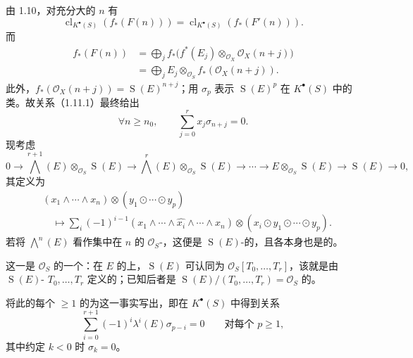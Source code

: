 由 1.10，对充分大的 $n$ 有
\[
\operatorname{cl}_{K^\bullet(S)}(f_*(F(n)))=
\operatorname{cl}_{K^\bullet(S)}(f_*(F'(n))).
\]
而
\[
\begin{aligned}
f_*(F(n))
&=\bigoplus_j f_*\bigl(f^*(E_j)\otimes_{\mathcal O_X}\mathcal O_X(n+j)\bigr)\\
&=\bigoplus_j E_j\otimes_{\mathcal O_S}f_*(\mathcal O_X(n+j)).
\end{aligned}
\]
此外，$f_*(\mathcal O_X(n+j))=\operatorname{S}(E)^{n+j}$；用 $\sigma_p$ 表示 $\operatorname{S}(E)^p$ 在 $K^\bullet(S)$ 中的类。故关系（1.11.1）最终给出
\[
\forall n\geq n_0,\qquad\sum_{j=0}^r x_j\sigma_{n+j}=0.\tag{1.11.2}
\]
现考虑
\[
0\longrightarrow\bigwedge^{r+1}(E)\otimes_{\mathcal O_S}\operatorname{S}(E)
\longrightarrow\bigwedge^r(E)\otimes_{\mathcal O_S}\operatorname{S}(E)
\longrightarrow\cdots\longrightarrow E\otimes_{\mathcal O_S}\operatorname{S}(E)
\longrightarrow\operatorname{S}(E)\longrightarrow0,
\]
其定义为
\[
\begin{aligned}
{}&(x_1\wedge\cdots\wedge x_n)\otimes(y_1\odot\cdots\odot y_p)\\
&\quad\longmapsto\sum_i(-1)^{i-1}
(x_1\wedge\cdots\wedge\widehat{x_i}\wedge\cdots\wedge x_n)
\otimes(x_i\odot y_1\odot\cdots\odot y_p).
\end{aligned}
\]
若将 $\bigwedge^n(E)$ 看作集中在 $n$ 的 $\mathcal O_S$-，这便是 $\operatorname{S}(E)$-的，且各本身也是的。

这一是 $\mathcal O_S$ 的一个：在 $E$ 的上，$\operatorname{S}(E)$ 可认同为 $\mathcal O_S[T_0,\ldots,T_r]$，该就是由 $\operatorname{S}(E)$- $T_0,\ldots,T_r$ 定义的；已知后者是 $\operatorname{S}(E)/(T_0,\ldots,T_r)=\mathcal O_S$ 的。

将此的每个 $\geq1$ 的为这一事实写出，即在 $K^\bullet(S)$ 中得到关系
\[
\sum_{i=0}^{r+1}(-1)^i\lambda^i(E)\sigma_{p-i}=0
\qquad\text{对每个 $p\geq1$},\tag{1.11.3}
\]
其中约定 $k<0$ 时 $\sigma_k=0$。


